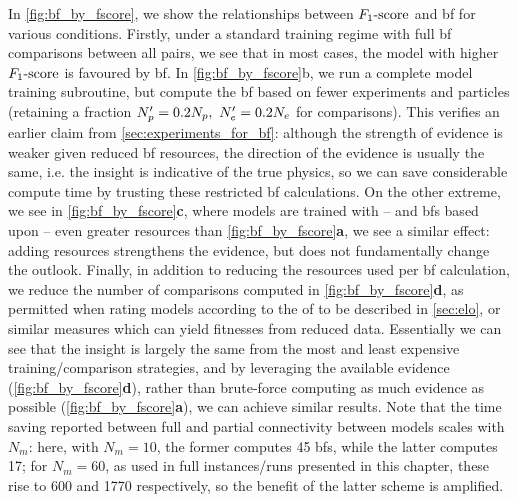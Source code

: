 In \cref{fig:bf_by_fscore}, we show the relationships between $ F_{1}\text{-score} $ and \gls{bf} for various conditions. 
Firstly, under a standard training regime with full \gls{bf} comparisons between all pairs, 
    we see that in most cases, the model with higher $ F_{1}\text{-score} $ is favoured by \gls{bf}.
In \cref{fig:bf_by_fscore}b, we run a complete model training subroutine, but compute the \gls{bf} based on fewer experiments and particles 
    (retaining a fraction $N_p^{\prime} = 0.2N_p, \ N_e^{\prime} = 0.2N_e$ for comparisons).
This verifies an earlier claim from \cref{sec:experiments_for_bf}: 
    although the strength of evidence is weaker given reduced \gls{bf} resources, 
    the direction of the evidence is usually the same, i.e. the insight is indicative of the true physics, 
    so we can save considerable compute time by trusting these restricted \gls{bf} calculations. 
On the other extreme, we see in \cref{fig:bf_by_fscore}\textbf{c}, where models are trained with
    -- and \glspl{bf} based upon -- even greater resources than \cref{fig:bf_by_fscore}\textbf{a}, we see a similar effect: 
    adding resources strengthens the evidence, but does not fundamentally change the outlook. 
Finally, in addition to reducing the resources used per \gls{bf} calculation, 
    we reduce the number of comparisons computed in \cref{fig:bf_by_fscore}\textbf{d}, 
    as permitted when rating models according to the \gls{of} to be described in \cref{sec:elo}, 
    or similar measures which can yield fitnesses from reduced data. 
Essentially we can see that the insight is largely the same 
    from the most and least expensive training/comparison strategies, 
    and by leveraging the available evidence (\cref{fig:bf_by_fscore}\textbf{d}), 
    rather than brute-force computing as much evidence as possible (\cref{fig:bf_by_fscore}\textbf{a}), 
    we can achieve similar results. 
Note that the time saving reported between full and partial connectivity between models scales with $N_m$: 
    here, with $N_m=10$, the former computes 45 \glspl{bf}, while the latter computes 17;
    for $N_m=60$, as used in full instances/runs presented in this chapter, these rise to 600 and 1770 respectively, 
    so the benefit of the latter scheme is amplified. 

